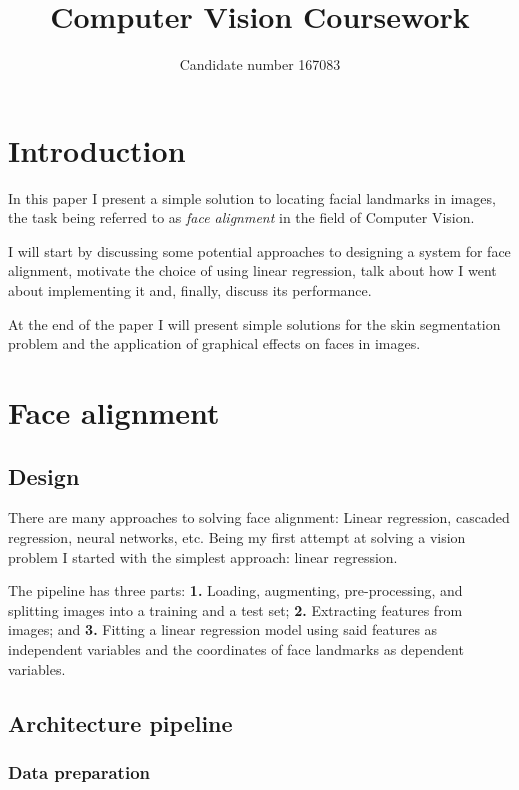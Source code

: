 \documentclass{article}
\title{Computer Vision Coursework}
\author{Candidate number 167083}
\begin{document}
\setcounter{page}{0}
\maketitle\newpage


\section{Introduction}
In this paper I present a simple solution to locating facial landmarks in images, the task being referred to as \emph{face alignment} in the field of Computer Vision.

I will start by discussing some potential approaches to designing a system for face alignment, motivate the choice of using linear regression, talk about how I went about implementing it and, finally, discuss its performance.

At the end of the paper I will present simple solutions for the skin segmentation problem and the application of graphical effects on faces in images.

\section{Face alignment}

\subsection{Design}
There are many approaches to solving face alignment: Linear regression, cascaded regression\cite{cascaded1}\cite{cascaded2}\cite{cascaded3}\cite{cascaded4}, neural networks, etc. Being my first attempt at solving a vision problem I started with the simplest approach: linear regression.

The pipeline has three parts: \textbf{1.} Loading, augmenting, pre-processing, and splitting images into a training and a test set; \textbf{2.} Extracting features from images; and \textbf{3.} Fitting a linear regression model using said features as independent variables and the coordinates of face landmarks as dependent variables.

\subsection{Architecture pipeline}

\subsubsection{Data preparation}\label{section:data-prep}
\end{document}
